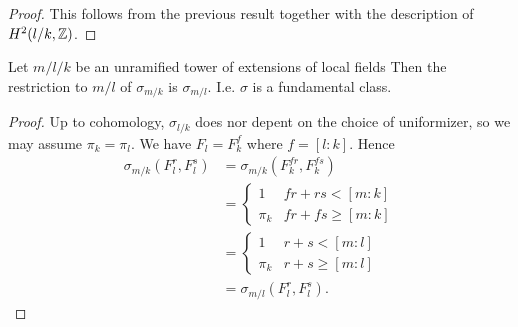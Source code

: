 \begin{proof}
	This follows from the previous result together with
	the description of $H^2(l/k,{\mathbb Z})$.
\end{proof}


\begin{lemma}
	Let $m / l / k$ be an unramified tower of extensions of local fields
	Then the restriction to $m/l$ of $\sigma_{m/k}$ is $\sigma_{m/l}$.
	I.e. $\sigma$ is a fundamental class.
\end{lemma}

\begin{proof}
	Up to cohomology, $\sigma_{l/k}$ does nor depent on the choice of
	uniformizer, so we may assume $\pi_k=\pi_l$.
	We have $F_l = F_k^f$ where $f = [l:k]$.
	Hence
	\begin{align*}
		\sigma_{m/k}(F_l^r, F_l^s)
		&=
		\sigma_{m/k}(F_k^{fr}, F_k^{fs})\\
		&=
		\begin{cases}
			1 & fr + rs < [m:k] \\
			\pi_k & fr + fs \ge [m:k]
		\end{cases}\\
		&=
		\begin{cases}
			1 & r + s < [m:l] \\
			\pi_k & r + s \ge [m:l]
		\end{cases}\\
		&=\sigma_{m/l}(F_l^r,F_l^s).
	\end{align*}
\end{proof}
